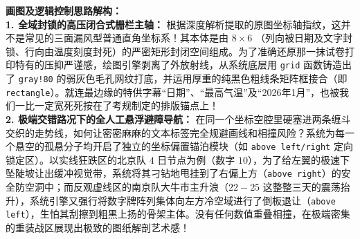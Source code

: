 \begin{center}
\end{center}

\vspace{0.4cm}
{\small\color{blue!70!black}
\textbf{画图及逻辑控制思路解构：}\\
\textbf{1. 全域封锁的高压闭合式栅栏主轴：} 根据深度解析提取的原图坐标轴指纹，这并不是常见的三面漏风型普通直角坐标系！其本体是由 $8 \times 6$ （列向被日期及文字封锁、行向由温度刻度封死）的严密矩形封闭空间组成。为了准确还原那一抹试卷打印特有的压抑严谨感，绘图引擎剥离了外放射线，从系统底层用 \texttt{grid} 函数铸造出了 \texttt{gray!80} 的弱灰色毛孔网纹打底，并运用厚重的纯黑色粗线条矩阵框接合（即 \texttt{rectangle}）。就连最边缘的特供字幕“日期”、“最高气温”及“2026年1月”，也被我们一比一定宽死死按在了考规制定的排版锚点上！\\
\textbf{2. 极端交错路况下的全人工悬浮避障导航：} 在同一个坐标空腔里硬塞进两条缠斗交织的走势线，如何让密密麻麻的文本标签完全规避画线和相撞风险？系统为每一个悬空的孤悬分子均开启了独立的坐标偏置锚泊模块（如 \texttt{above left/right} 定向锁定区）。以实线狂跌区的北京队 $4$ 日节点为例（数字 $10$），为了给左翼的极速下坠陡坡让出缓冲视觉带，系统将其刁钻地甩挂到了右偏上方（\texttt{above right}）的安全防空洞中；而反观虚线区的南京队大牛市主升浪（$22-25$ 这整整三天的震荡抬升），系统引擎又强行将数字牌阵列集体向左方冷空域进行了倒板退让（\texttt{above left}），生怕其刮擦到粗黑上扬的骨架主体。没有任何数值重叠相撞，在极端密集的重装战区展现出极致的图纸解剖艺术感！
}


